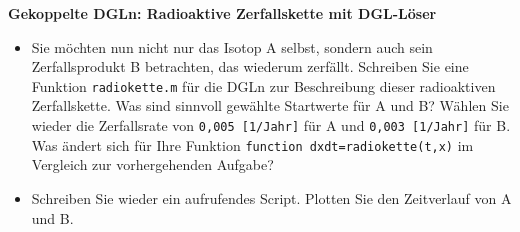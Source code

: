   \secMexercise
      \begin{frame}
          \frameMexercise
          \begin{exercise}
              \sloppy
              \textbf{Gekoppelte DGLn: Radioaktive Zerfallskette mit DGL-Löser}
              \begin{itemize}
                \item Sie möchten nun nicht nur das Isotop A selbst, sondern auch sein Zerfallsprodukt B betrachten, das wiederum zerfällt. Schreiben Sie eine Funktion \texttt{radiokette.m} für die DGLn zur Beschreibung dieser radioaktiven Zerfallskette. Was sind sinnvoll gewählte Startwerte für A und B? Wählen Sie wieder die Zerfallsrate von \texttt{0,005  [1/Jahr]} für A und \texttt{0,003  [1/Jahr]} für B. Was ändert sich für Ihre Funktion \texttt{function dxdt=radiokette(t,x)} im Vergleich zur vorhergehenden Aufgabe?
                \item Schreiben Sie wieder ein aufrufendes Script. Plotten Sie den Zeitverlauf von A und B.
              \end{itemize}
          \end{exercise}
      \end{frame}

